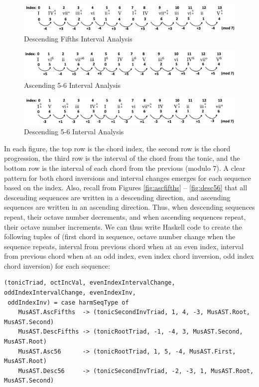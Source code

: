 \documentclass{report}
\begin{document}
\begin{figure}[h!]
\centering
\includegraphics[width=\textwidth]{images/desc_fifths_intervals}
  \caption{Descending Fifths Interval Analysis}
\end{figure}

\begin{figure}[h!]
\centering
\includegraphics[width=\textwidth]{images/asc_56_intervals}
  \caption{Ascending 5-6 Interval Analysis}
\end{figure}

\begin{figure}[h!]
\centering
\includegraphics[width=\textwidth]{images/desc_56_intervals}
  \caption{Descending 5-6 Interval Analysis}
\end{figure}

In each figure, the top row is the chord index, the second row is the chord progression, the third row is the interval of the chord from the tonic, and the bottom row is the interval of each chord from the previous (modulo 7). A clear pattern for both chord inversions and interval changes emerges for each sequence based on the index. Also, recall from Figures \ref{fig:ascfifths} -- \ref{fig:desc56} that all descending sequences are written in a descending direction, and ascending sequences are written in an ascending direction. Thus, when descending sequences repeat, their octave number decrements, and when ascending sequences repeat, their octave number increments. We can thus write Haskell code to create the following tuples of (first chord in sequence, octave number change when the sequence repeats, interval from previous chord when at an even index, interval from previous chord when at an odd index, even index chord inversion, odd index chord inversion) for each sequence:

\begin{verbatim}
(tonicTriad, octIncVal, evenIndexIntervalChange, oddIndexIntervalChange, evenIndexInv, 
 oddIndexInv) = case harmSeqType of 
    MusAST.AscFifths  -> (tonicSecondInvTriad, 1, 4, -3, MusAST.Root, MusAST.Second)
    MusAST.DescFifths -> (tonicRootTriad, -1, -4, 3, MusAST.Second, MusAST.Root)
    MusAST.Asc56      -> (tonicRootTriad, 1, 5, -4, MusAST.First, MusAST.Root)
    MusAST.Desc56     -> (tonicSecondInvTriad, -2, -3, 1, MusAST.Root, MusAST.Second)
\end{verbatim}
\end{document}
